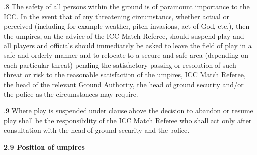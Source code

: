 \documentclass[12pt]{article}
\begin{document}
\vspace{\baselineskip}
\begin{adjustwidth}{0.0in}{-0.01in}
\begin{Center}
{\fontsize{8pt}{9.6pt}\par}
\end{Center}\par

\end{adjustwidth}


\vspace{\baselineskip}

\vspace{\baselineskip}
\begin{adjustwidth}{0.5in}{0.04in}
{\fontsize{9pt}{10.8pt}.8 \tabto{0.49in} The safety of all persons within the ground is of paramount importance to the ICC. In the event that of any threatening circumstance, whether actual or perceived (including for example weather, pitch invasions, act of God, etc.), then the umpires, on the advice of the ICC Match Referee, should suspend play and all players and officials should immediately be asked to leave the field of play in a safe and orderly manner and to relocate to a secure and safe area (depending on each particular threat) pending the satisfactory passing or resolution of such threat or risk to the reasonable satisfaction of the umpires, ICC Match Referee, the head of the relevant Ground Authority, the head of ground security and/or the police as the circumstances may require.\par}\par

\end{adjustwidth}


\vspace{\baselineskip}
\begin{adjustwidth}{0.5in}{0.01in}
{\fontsize{9pt}{10.8pt}.9 \tabto{0.49in} Where play is suspended under clause above the decision to abandon or resume play shall be the responsibility of the ICC Match Referee who shall act only after consultation with the head of ground security and the police.\par}\par

\end{adjustwidth}


\vspace{\baselineskip}
{\fontsize{11pt}{13.2pt}\selectfont \textbf{2.9 \tabto{0.47in} Position of umpires}\par}\par
\end{document}
